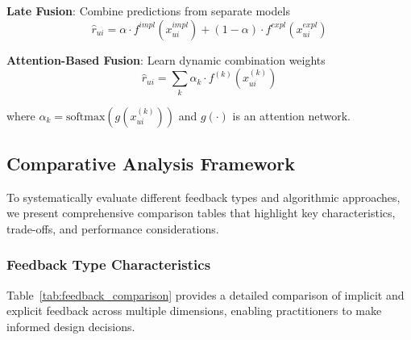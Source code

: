 \textbf{Late Fusion}: Combine predictions from separate models
\begin{equation}
\hat{r}_{ui} = \alpha \cdot f^{impl}(x_{ui}^{impl}) + (1-\alpha) \cdot f^{expl}(x_{ui}^{expl})
\end{equation}

\textbf{Attention-Based Fusion}: Learn dynamic combination weights
\begin{equation}
\hat{r}_{ui} = \sum_k \alpha_k \cdot f^{(k)}(x_{ui}^{(k)})
\end{equation}

where $\alpha_k = \text{softmax}(g(x_{ui}^{(k)}))$ and $g(\cdot)$ is an attention network.

\subsection{Comparative Analysis Framework}

To systematically evaluate different feedback types and algorithmic approaches, we present comprehensive comparison tables that highlight key characteristics, trade-offs, and performance considerations.

\subsubsection{Feedback Type Characteristics}
Table~\ref{tab:feedback_comparison} provides a detailed comparison of implicit and explicit feedback across multiple dimensions, enabling practitioners to make informed design decisions.


